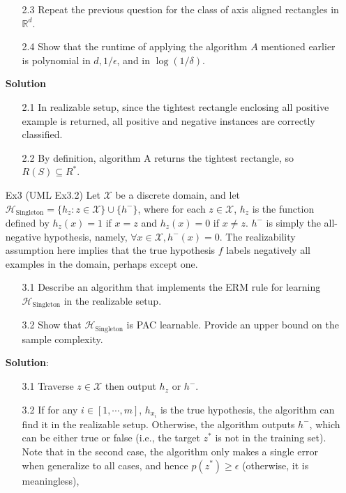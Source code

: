 \documentclass{article}
\begin{document}
\begin{itemize}
\begin{itemize}
	\item[2.3] Repeat the previous question for the class of axis aligned rectangles in $\mathbb{R}^d$.
		
	\item[2.4] Show that the runtime of applying the algorithm $A$ mentioned earlier is polynomial in $d, 1/\epsilon$, and in $\log(1/\delta)$.
	\end{itemize}

	\item[] \textbf{Solution}
	
	\begin{itemize}
	\item[2.1] In realizable setup, since the tightest rectangle enclosing all positive example is returned, all positive and negative instances are correctly classified.
	\item[2.2] By definition, algorithm A returns the tightest rectangle, so $R(S)\subseteq R^*$. 
	\end{itemize}

\item[Ex3] (UML Ex3.2) Let $\mathcal{X}$ be a discrete domain, and let $\mathcal{H}_{\text{Singleton}}=\{h_z:z\in\mathcal{X}\}\cup\{h^-\}$, where for each $z\in\mathcal{X}$, $h_z$ is the function defined by $h_z(x)=1$ if $x=z$ and $h_z(x)=0$ if $x\neq z$. $h^-$ is simply the all-negative hypothesis, namely, $\forall x\in\mathcal{X},h^-(x)=0$. The realizability assumption here implies that the true hypothesis $f$ labels negatively all examples in the domain, perhaps except one.

	\begin{itemize}
	\item[3.1] Describe an algorithm that implements the ERM rule for learning $\mathcal{H}_{\text{Singleton}}$ in the realizable setup.
	\item[3.2] Show that $\mathcal{H}_{\text{Singleton}}$ is PAC learnable. Provide an upper bound on the sample complexity.
	\end{itemize} 

	\item[] \textbf{Solution}:
	\begin{itemize}
	\item[3.1] Traverse $z\in\mathcal{X}$ then output $h_z$ or $h^-$.
	\item[3.2] If for any $i\in[1,\cdots,m]$, $h_{x_i}$ is the true hypothesis, the algorithm can find it in the realizable setup. Otherwise, the algorithm outputs $h^-$, which can be either true or false (i.e., the target $z^*$ is not in the training set). Note that in the second case, the algorithm only makes a single error when generalize to all cases, and hence $p(z^*)\geq\epsilon$ (otherwise, it is meaningless),
	

\end{itemize}
\end{itemize}
\end{document}
